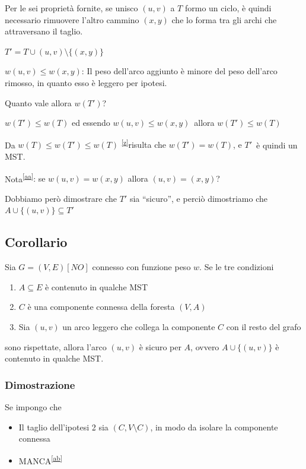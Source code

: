 {Per le sei proprietà fornite, se unisco $(u,v)$ a $T$ formo un ciclo, è quindi necessario rimuovere l'altro cammino $(x,y)$ che lo forma tra gli archi che attraversano il taglio. }

$T' = T \cup {(u,v)} \setminus \{(x,y)\} $



$w(u,v) \leq w(x,y)${: Il peso dell'arco aggiunto è minore del peso dell'arco rimosso, in quanto esso è leggero per ipotesi.}

{Quanto vale allora $w(T')$? }

$w(T') \leq w(T)$ {ed essendo }$w(u,v) \leq w(x,y)${~allora $w(T') \leq w(T)$}

{Da }$w(T) \leq w(T') \leq w(T)$ \textsuperscript{\protect\hyperlink{cmnt26}{{[}z{]}}}{risulta che $w(T') = w(T)$, e }$T'${~è quindi un MST.}

{Nota}\textsuperscript{\protect\hyperlink{cmnt27}{{[}aa{]}}}{: se $w(u,v) = w(x,y)$ allora $(u,v) = (x,y)$?}

{Dobbiamo però dimostrare che $T'$ sia ``sicuro'', e perciò dimostriamo che \\ $A \cup \{(u,v)\} \subseteq T'$}

\subsection{Corollario}

{Sia $G=(V,E) [NO]$ connesso con funzione peso $w$. Se le tre condizioni}

\begin{enumerate}
\tightlist
\item
  {$A \subseteq E$ è contenuto in qualche MST}
\item
  {$C$ è una componente connessa della foresta $(V,A)$}
\item
  {Sia $(u,v)$ un arco leggero che collega la componente $C$ con il resto del grafo}
\end{enumerate}

{sono rispettate, allora l'arco $(u,v)$ è sicuro per $A$, ovvero $A \cup \{(u,v)\}$ è contenuto in qualche MST.}

\subsubsection{Dimostrazione}

{Se impongo che}

\begin{itemize}
\tightlist
\item
  {Il taglio dell'ipotesi 2 sia $(C,V\setminus C)$, in modo da isolare la componente connessa}
\item
  {MANCA}\textsuperscript{\protect\hyperlink{cmnt28}{{[}ab{]}}}
\end{itemize}

